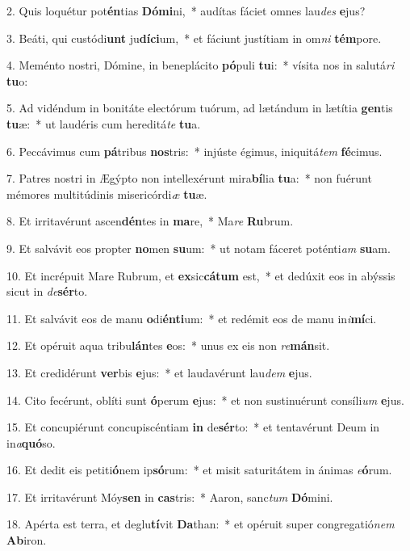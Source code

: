 2. Quis loquétur pot\textbf{én}tias \textbf{Dó}\textbf{mi}ni,~*  audítas fáciet omnes lau\textit{des} \textbf{e}jus?\

3. Beáti, qui custódi\textbf{unt} ju\textbf{dí}\textbf{ci}um,~*  et fáciunt justítiam in om\textit{ni} \textbf{tém}pore.\

4. Meménto nostri, Dómine, in beneplácito \textbf{pó}puli \textbf{tu}i:~*  vísita nos in salutá\textit{ri} \textbf{tu}o:\

5. Ad vidéndum in bonitáte electórum tuórum, ad lætándum in lætítia \textbf{gen}tis \textbf{tu}æ:~*  ut laudéris cum hereditá\textit{te} \textbf{tu}a.\

6. Peccávimus cum \textbf{pá}tribus \textbf{nos}tris:~*  injúste égimus, iniquitá\textit{tem} \textbf{fé}cimus.\

7. Patres nostri in Ægýpto non intellexérunt mira\textbf{bí}lia \textbf{tu}a:~*  non fuérunt mémores multitúdinis misericórdi\textit{æ} \textbf{tu}æ.\

8. Et irritavérunt ascen\textbf{dén}tes in \textbf{ma}re,~*  Ma\textit{re} \textbf{Ru}brum.\

9. Et salvávit eos propter \textbf{no}men \textbf{su}um:~*  ut notam fáceret poténti\textit{am} \textbf{su}am.\

10. Et incrépuit Mare Rubrum, et \textbf{ex}sic\textbf{cá}\textbf{tum} est,~*  et dedúxit eos in abýssis sicut in \textit{de}\textbf{sér}to.\

11. Et salvávit eos de manu \textbf{o}di\textbf{én}\textbf{ti}um:~*  et redémit eos de manu in\textit{i}\textbf{mí}ci.\

12. Et opéruit aqua tribu\textbf{lán}tes \textbf{e}os:~*  unus ex eis non \textit{re}\textbf{mán}sit.\

13. Et credidérunt \textbf{ver}bis \textbf{e}jus:~*  et laudavérunt lau\textit{dem} \textbf{e}jus.\

14. Cito fecérunt, oblíti sunt \textbf{ó}perum \textbf{e}jus:~*  et non sustinuérunt consíli\textit{um} \textbf{e}jus.\

15. Et concupiérunt concupiscéntiam \textbf{in} de\textbf{sér}to:~*  et tentavérunt Deum in in\textit{a}\textbf{quó}so.\

16. Et dedit eis petiti\textbf{ó}nem ip\textbf{só}rum:~*  et misit saturitátem in ánimas \textit{e}\textbf{ó}rum.\

17. Et irritavérunt Móy\textbf{sen} in \textbf{cas}tris:~*  Aaron, sanc\textit{tum} \textbf{Dó}mini.\

18. Apérta est terra, et deglu\textbf{tí}vit \textbf{Da}than:~*  et opéruit super congregatió\textit{nem} \textbf{Ab}iron.\

